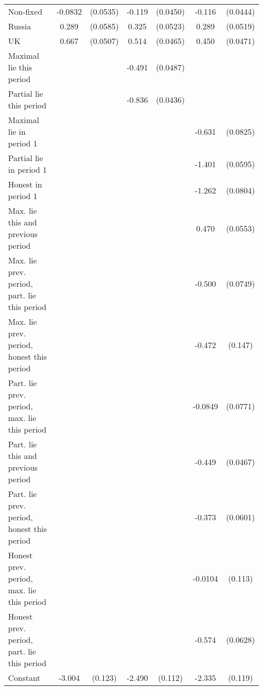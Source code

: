 {\begin{tabular}{l*{3}{cc}}
Non-fixed       &  -0.0832         & (0.0535)&   -0.119\sym{***}& (0.0450)&   -0.116\sym{***}& (0.0444)\\
Russia          &    0.289\sym{***}& (0.0585)&    0.325\sym{***}& (0.0523)&    0.289\sym{***}& (0.0519)\\
UK              &    0.667\sym{***}& (0.0507)&    0.514\sym{***}& (0.0465)&    0.450\sym{***}& (0.0471)\\
Maximal lie this period&                  &         &   -0.491\sym{***}& (0.0487)&                  &         \\
Partial lie this period&                  &         &   -0.836\sym{***}& (0.0436)&                  &         \\
Maximal lie in period 1&                  &         &                  &         &   -0.631\sym{***}& (0.0825)\\
Partial lie in period 1&                  &         &                  &         &   -1.401\sym{***}& (0.0595)\\
Honest in period 1&                  &         &                  &         &   -1.262\sym{***}& (0.0804)\\
Max. lie this and previous period&                  &         &                  &         &    0.470\sym{***}& (0.0553)\\
Max. lie prev. period, part. lie this period&                  &         &                  &         &   -0.500\sym{***}& (0.0749)\\
Max. lie prev. period, honest this period&                  &         &                  &         &   -0.472\sym{***}&  (0.147)\\
Part. lie prev. period, max. lie this period&                  &         &                  &         &  -0.0849         & (0.0771)\\
Part. lie this and previous period&                  &         &                  &         &   -0.449\sym{***}& (0.0467)\\
Part. lie prev. period, honest this period&                  &         &                  &         &   -0.373\sym{***}& (0.0601)\\
Honest prev. period, max. lie this period&                  &         &                  &         &  -0.0104         &  (0.113)\\
Honest prev. period, part. lie this period&                  &         &                  &         &   -0.574\sym{***}& (0.0628)\\
Constant        &   -3.004\sym{***}&  (0.123)&   -2.490\sym{***}&  (0.112)&   -2.335\sym{***}&  (0.119)\\

\end{tabular}}
